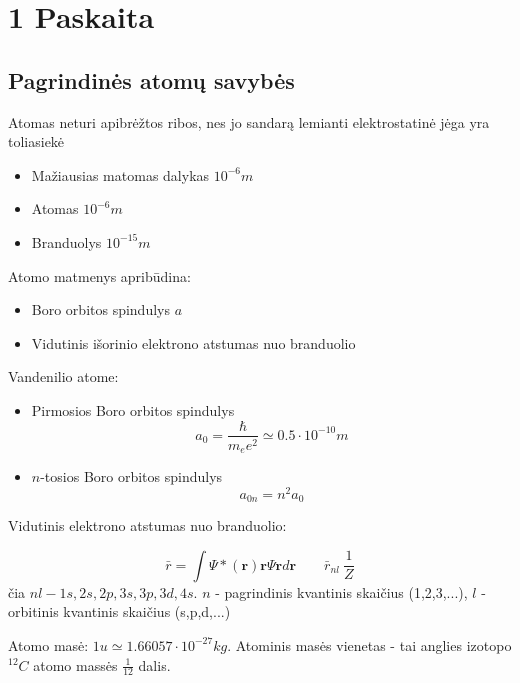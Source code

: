 \section{1 Paskaita}

\subsection*{Pagrindinės atomų savybės}

Atomas neturi apibrėžtos ribos, nes jo sandarą lemianti elektrostatinė jėga yra toliasiekė

\begin{itemize}
    \item Mažiausias matomas dalykas $10^{-6}m$\
    \item Atomas $10^{-6}m$
    \item Branduolys $10^{-15}m$
\end{itemize}

Atomo matmenys apribūdina:
\begin{itemize}
    \item Boro orbitos spindulys $a$
    \item Vidutinis išorinio elektrono atstumas nuo branduolio
\end{itemize}

Vandenilio atome:
\begin{itemize}
    \item Pirmosios Boro orbitos spindulys
        \begin{equation*}
            a_0 = \frac{\hbar}{m_e e^2} \simeq 0.5 \cdot 10^{-10}m
        \end{equation*}
    \item $n$-tosios Boro orbitos spindulys
        \begin{equation*}
            a_{0n} = n^2 a_0 
        \end{equation*}
\end{itemize}

Vidutinis elektrono atstumas nuo branduolio:

\begin{equation*}
    \bar{r} = \int \Psi*(\bm{r}) \bm{r} \Psi{\bm{r}} d \bm{r} \qquad \bar{r}_{nl} ~ \frac{1}{Z} 
\end{equation*}
čia $nl - 1s,2s,2p,3s,3p,3d,4s$. $n$ - pagrindinis kvantinis skaičius (1,2,3,...), $l$ - orbitinis kvantinis skaičius (s,p,d,...)

Atomo masė: $1u \simeq 1.66057 \cdot 10^{-27} kg$. Atominis masės vienetas - tai anglies izotopo ${}^{12}C$ atomo massės $\frac{1}{12}$ dalis.

